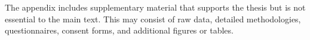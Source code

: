 \begin{appendices}
\label{section:appendix}
The appendix includes supplementary material that supports the thesis but is not essential to the main text. This may consist of raw data, detailed methodologies, questionnaires, consent forms, and additional figures or tables.

\end{appendices}